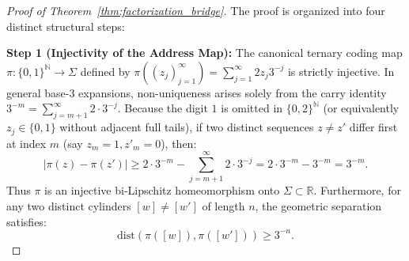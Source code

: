 \documentclass[11pt,reqno]{amsart}
\theoremstyle{plain}
\theoremstyle{definition}
\theoremstyle{remark}
\newcommand{\R}{\mathbb{R}}
\newcommand{\N}{\mathbb{N}}
\begin{document}
\begin{proof}[Proof of Theorem~\ref{thm:factorization_bridge}]
The proof is organized into four distinct structural steps:

\textbf{Step 1 (Injectivity of the Address Map):}
The canonical ternary coding map $\pi : \{0, 1\}^\N \to \Sigma$ defined by $\pi((z_j)_{j=1}^\infty) = \sum_{j=1}^\infty 2 z_j 3^{-j}$ is strictly injective. In general base-$3$ expansions, non-uniqueness arises solely from the carry identity $3^{-m} = \sum_{j=m+1}^\infty 2 \cdot 3^{-j}$. Because the digit $1$ is omitted in $\{0, 2\}^\N$ (or equivalently $z_j \in \{0, 1\}$ without adjacent full tails), if two distinct sequences $z \ne z'$ differ first at index $m$ (say $z_m = 1, z'_m = 0$), then:
\begin{equation}
|\pi(z) - \pi(z')| \ge 2 \cdot 3^{-m} - \sum_{j=m+1}^\infty 2 \cdot 3^{-j} = 2 \cdot 3^{-m} - 3^{-m} = 3^{-m}.
\end{equation}
Thus $\pi$ is an injective bi-Lipschitz homeomorphism onto $\Sigma \subset \R$. Furthermore, for any two distinct cylinders $[w] \ne [w']$ of length $n$, the geometric separation satisfies:
\begin{equation}
\mathrm{dist}(\pi([w]), \pi([w'])) \ge 3^{-n}.
\end{equation}


\end{proof}
\end{document}
